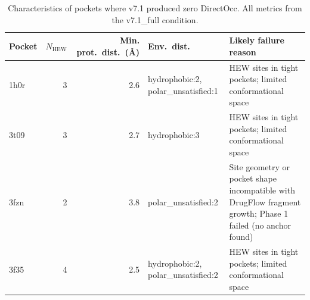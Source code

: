 \begin{table}[t]
\centering
\caption{Characteristics of pockets where v7.1 produced zero DirectOcc.
All metrics from the v7.1\_full condition.}
\label{tab:failures}
\begin{tabular}{lrrp{3cm}p{5cm}}
\toprule
Pocket & $N_{\text{HEW}}$ & Min. prot.\ dist.\ (\AA) & Env.\ dist. & Likely failure reason \\
\midrule
1h0r & 3 & 2.6 & hydrophobic:2, polar_unsatisfied:1 & HEW sites in tight pockets; limited conformational space \\
3t09 & 3 & 2.7 & hydrophobic:3 & HEW sites in tight pockets; limited conformational space \\
3fzn & 2 & 3.8 & polar_unsatisfied:2 & Site geometry or pocket shape incompatible with DrugFlow fragment growth; Phase 1 failed (no anchor found) \\
3f35 & 4 & 2.5 & hydrophobic:2, polar_unsatisfied:2 & HEW sites in tight pockets; limited conformational space \\
\bottomrule
\end{tabular}
\end{table}